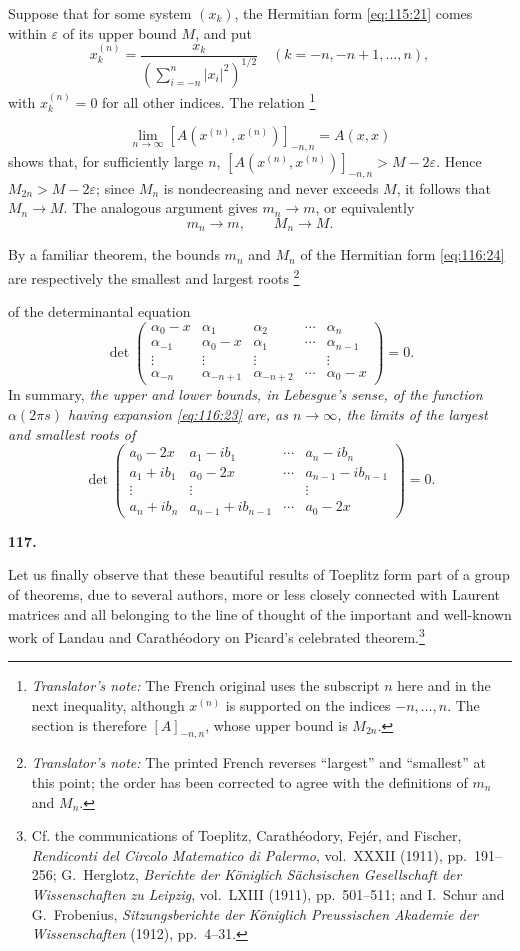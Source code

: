 \documentclass[
  paper=b5,
  fontsize=13pt,
  twoside=true,
  open=any,
  bookmarkpackage=false,
  chapterprefix=true,
  headings=normal
]{scrbook}
\theoremstyle{definition}
\newcommand{\numberedparagraph}[1]{%
  \par\medskip\phantomsection\label{sec:#1}%
  \noindent\textbf{#1.}\enspace
}
\newcounter{translatornote}
\newcommand{\translatornotelabel}{T\arabic{translatornote}}
\newcommand{\translatornote}[1]{%
  \stepcounter{translatornote}%
  \begingroup
    \edef\savedfootnotenumber{\number\value{footnote}}%
    \renewcommand{\thefootnote}{\translatornotelabel}%
    \footnote{\emph{Translator's note:} #1}%
    \setcounter{footnote}{\savedfootnotenumber}%
  \endgroup
}
\begin{document}
Suppose that for some system \((x_k)\), the Hermitian form
\eqref{eq:115:21} comes within \(\varepsilon\) of its upper bound \(M\), and
put
\[
  x_k^{(n)}=
  \frac{x_k}{\left(\sum_{i=-n}^{n}|x_i|^2\right)^{1/2}}
  \quad(k=-n,-n+1,\ldots,n),
\]
with \(x_k^{(n)}=0\) for all other indices.  The relation
\translatornote{The French original uses the subscript \(n\) here and in the
next inequality, although \(x^{(n)}\) is supported on the indices
\(-n,\ldots,n\).  The section is therefore \([A]_{-n,n}\), whose upper bound
is \(M_{2n}\).}
\[
  \lim_{n\to\infty}[A(x^{(n)},x^{(n)})]_{-n,n}=A(x,x)
\]
shows that, for sufficiently large \(n\),
\([A(x^{(n)},x^{(n)})]_{-n,n}>M-2\varepsilon\).  Hence
\(M_{2n}>M-2\varepsilon\); since \(M_n\) is nondecreasing and never exceeds
\(M\), it follows that \(M_n\to M\).  The analogous argument gives
\(m_n\to m\), or equivalently
\[
  m_n\longrightarrow m,
  \qquad M_n\longrightarrow M.
\]

By a familiar theorem, the bounds \(m_n\) and \(M_n\) of the Hermitian form
\eqref{eq:116:24} are respectively the smallest and largest roots
\translatornote{The printed French reverses ``largest'' and
``smallest'' at this point; the order has been corrected to agree with the
definitions of \(m_n\) and \(M_n\).}
of the determinantal equation
\[
  \det\!\begin{pmatrix}
    \alpha_0-x&\alpha_1&\alpha_2&\cdots&\alpha_n\\
    \alpha_{-1}&\alpha_0-x&\alpha_1&\cdots&\alpha_{n-1}\\
    \vdots&\vdots&\vdots&&\vdots\\
    \alpha_{-n}&\alpha_{-n+1}&\alpha_{-n+2}&\cdots&\alpha_0-x
  \end{pmatrix}=0.
\]
In summary, \emph{the upper and lower bounds, in Lebesgue's sense,
of the function \(\alpha(2\pi s)\) having expansion \eqref{eq:116:23} are,
as \(n\to\infty\), the limits of the largest and smallest roots of}
\[
  \det\!\begin{pmatrix}
    a_0-2x&a_1-ib_1&\cdots&a_n-ib_n\\
    a_1+ib_1&a_0-2x&\cdots&a_{n-1}-ib_{n-1}\\
    \vdots&\vdots&&\vdots\\
    a_n+ib_n&a_{n-1}+ib_{n-1}&\cdots&a_0-2x
  \end{pmatrix}=0.
\]

\numberedparagraph{117}
Let us finally observe that these beautiful results of Toeplitz form part of a
group of theorems, due to several authors, more or less closely connected with
Laurent matrices and all belonging to the line of thought of the important and
well-known work of Landau and Carathéodory on Picard's celebrated
theorem.\footnote{Cf. the communications of Toeplitz, Carathéodory, Fejér, and
Fischer, \emph{Rendiconti del Circolo Matematico di Palermo}, vol.~XXXII
(1911), pp.~191--256; G.~Herglotz, \emph{Berichte der Königlich Sächsischen
Gesellschaft der Wissenschaften zu Leipzig}, vol.~LXIII (1911), pp.~501--511;
and I.~Schur and G.~Frobenius, \emph{Sitzungsberichte der Königlich Preussischen
Akademie der Wissenschaften} (1912), pp.~4--31.}
\end{document}
